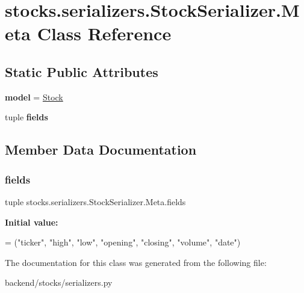 \hypertarget{classstocks_1_1serializers_1_1_stock_serializer_1_1_meta}{}\section{stocks.\+serializers.\+Stock\+Serializer.\+Meta Class Reference}
\label{classstocks_1_1serializers_1_1_stock_serializer_1_1_meta}
\subsection*{Static Public Attributes}
\begin{DoxyCompactItemize}
\item 
\mbox{\label{classstocks_1_1serializers_1_1_stock_serializer_1_1_meta_a6af5e3bff413e445333d51390b26cbc6}} 
{\bfseries model} = \mbox{\hyperlink{classstocks_1_1models_1_1_stock}{Stock}}
\item 
tuple {\bfseries fields}
\end{DoxyCompactItemize}


\subsection{Member Data Documentation}
\mbox{\label{classstocks_1_1serializers_1_1_stock_serializer_1_1_meta_aa606dd7e7d5d18b676c8682055f764c1}} 
\subsubsection{\texorpdfstring{fields}{fields}}
{\footnotesize\ttfamily tuple stocks.\+serializers.\+Stock\+Serializer.\+Meta.\+fields\hspace{0.3cm}{\ttfamily [static]}}

{\bfseries Initial value\+:}
\begin{DoxyCode}
=  (\textcolor{stringliteral}{"ticker"}, \textcolor{stringliteral}{"high"}, \textcolor{stringliteral}{"low"},
                  \textcolor{stringliteral}{"opening"}, \textcolor{stringliteral}{"closing"}, \textcolor{stringliteral}{"volume"}, \textcolor{stringliteral}{"date"})
\end{DoxyCode}


The documentation for this class was generated from the following file\+:\begin{DoxyCompactItemize}
\item 
backend/stocks/serializers.\+py\end{DoxyCompactItemize}
